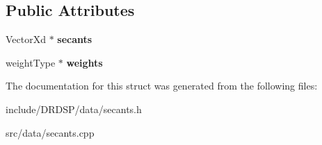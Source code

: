 \subsection*{Public Attributes}
\begin{DoxyCompactItemize}
\item 
\hypertarget{struct_d_r_d_s_p_1_1_secants_pre_computed_a15231ffddb89ae1eb2c83cbdc463905a}{Vector\-Xd $\ast$ {\bfseries secants}}\label{struct_d_r_d_s_p_1_1_secants_pre_computed_a15231ffddb89ae1eb2c83cbdc463905a}

\item 
\hypertarget{struct_d_r_d_s_p_1_1_secants_pre_computed_a4bb39354f325540fefe37eb7c3f59ad1}{weight\-Type $\ast$ {\bfseries weights}}\label{struct_d_r_d_s_p_1_1_secants_pre_computed_a4bb39354f325540fefe37eb7c3f59ad1}

\end{DoxyCompactItemize}


The documentation for this struct was generated from the following files\-:\begin{DoxyCompactItemize}
\item 
include/\-D\-R\-D\-S\-P/data/secants.\-h\item 
src/data/secants.\-cpp\end{DoxyCompactItemize}
